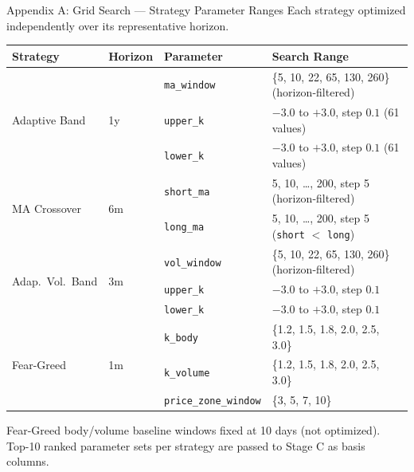 \documentclass[aspectratio=169]{beamer}
\begin{document}

\begin{frame}{Appendix A: Grid Search — Strategy Parameter Ranges}
  \small
  Each strategy optimized independently over its representative horizon.

  \vspace{0.4em}
  \begin{tabular}{llll}
    \toprule
    Strategy & Horizon & Parameter & Search Range \\
    \midrule
    \multirow{3}{*}{Adaptive Band}
      & \multirow{3}{*}{1y}
      & \texttt{ma\_window}  & \{5, 10, 22, 65, 130, 260\} (horizon-filtered) \\
      && \texttt{upper\_k}   & $-3.0$ to $+3.0$, step $0.1$ \quad (61 values) \\
      && \texttt{lower\_k}   & $-3.0$ to $+3.0$, step $0.1$ \quad (61 values) \\
    \midrule
    \multirow{2}{*}{MA Crossover}
      & \multirow{2}{*}{6m}
      & \texttt{short\_ma}  & 5, 10, \dots, 200, step 5 \quad (horizon-filtered) \\
      && \texttt{long\_ma}   & 5, 10, \dots, 200, step 5 \quad (\texttt{short} $<$ \texttt{long}) \\
    \midrule
    \multirow{3}{*}{Adap.\ Vol.\ Band}
      & \multirow{3}{*}{3m}
      & \texttt{vol\_window} & \{5, 10, 22, 65, 130, 260\} (horizon-filtered) \\
      && \texttt{upper\_k}   & $-3.0$ to $+3.0$, step $0.1$ \\
      && \texttt{lower\_k}   & $-3.0$ to $+3.0$, step $0.1$ \\
    \midrule
    \multirow{3}{*}{Fear-Greed}
      & \multirow{3}{*}{1m}
      & \texttt{k\_body}    & \{1.2, 1.5, 1.8, 2.0, 2.5, 3.0\} \\
      && \texttt{k\_volume}  & \{1.2, 1.5, 1.8, 2.0, 2.5, 3.0\} \\
      && \texttt{price\_zone\_window} & \{3, 5, 7, 10\} \\
    \bottomrule
  \end{tabular}

  \vspace{0.3em}
  \footnotesize
  Fear-Greed body/volume baseline windows fixed at 10 days (not optimized).\\
  Top-10 ranked parameter sets per strategy are passed to Stage C as basis columns.
\end{frame}
\end{document}
